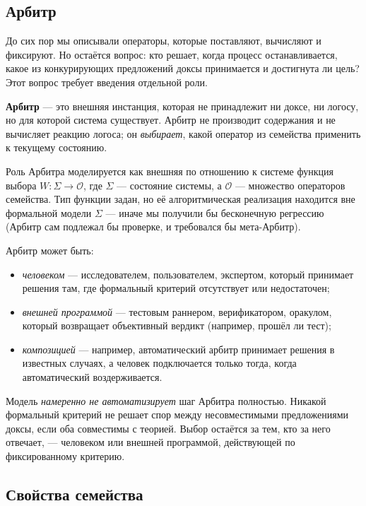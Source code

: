 \documentclass[12pt,a4paper]{article}
\begin{document}
\subsection{Арбитр}
\label{sec:arbiter}

До сих пор мы описывали операторы, которые поставляют, вычисляют и
фиксируют. Но остаётся вопрос: кто решает, когда процесс останавливается,
какое из конкурирующих предложений доксы принимается и достигнута ли цель?
Этот вопрос требует введения отдельной роли.

\textbf{Арбитр} --- это внешняя инстанция, которая не принадлежит ни доксе,
ни логосу, но для которой система существует. Арбитр не производит
содержания и не вычисляет реакцию логоса; он \emph{выбирает}, какой
оператор из семейства применить к текущему состоянию.

Роль Арбитра моделируется как внешняя по отношению к системе функция
выбора $W: \Sigma \to \mathcal{O}$, где $\Sigma$ --- состояние системы,
а $\mathcal{O}$ --- множество операторов семейства. Тип функции задан,
но её алгоритмическая реализация находится вне формальной модели $\Sigma$
--- иначе мы получили бы бесконечную регрессию (Арбитр сам подлежал
бы проверке, и требовался бы мета-Арбитр).

Арбитр может быть:
\begin{itemize}
    \item \emph{человеком} --- исследователем, пользователем, экспертом,
          который принимает решения там, где формальный критерий отсутствует
          или недостаточен;
    \item \emph{внешней программой} --- тестовым раннером, верификатором,
          оракулом, который возвращает объективный вердикт (например,
          прошёл ли тест);
    \item \emph{композицией} --- например, автоматический арбитр принимает
          решения в известных случаях, а человек подключается только тогда,
          когда автоматический воздерживается.
\end{itemize}

Модель \emph{намеренно не автоматизирует} шаг Арбитра полностью. Никакой
формальный критерий не решает спор между несовместимыми предложениями доксы,
если оба совместимы с теорией. Выбор остаётся за тем, кто за него отвечает,
--- человеком или внешней программой, действующей по фиксированному
критерию.

\subsection{Свойства семейства}
\label{sec:properties}
\end{document}
